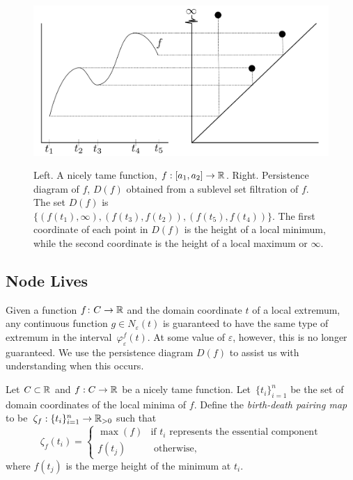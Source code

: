 \begin{figure}[htp]
    \centering
    {\includegraphics[width=.7\textwidth]{images/nodelife.pdf}} \\
    \caption{Left. A nicely tame function, $f:[a_1,a_2]\rightarrow \mathbb{R}$. Right. Persistence diagram of $f$, $D(f)$
	obtained from a sublevel set filtration of $f$.  The set
	$D(f)$ is $\{(f(t_1), \infty), (f(t_3), f(t_2)), (f(t_5), f(t_4))\}$. The first coordinate of each point in $D(f)$ is the height of a local minimum, while the second coordinate is the height of a local maximum or $\infty$.  }
    \label{fig:PD}
\end{figure}

\subsection{Node Lives}
\label{sec:node-lives}

Given a function $f \colon C \to \mathbb{R}$ and the domain coordinate $t$ of a local
extremum, any continuous function $g\in N_\varepsilon(t)$ is guaranteed to have 
the same type of extremum in the interval~$\varphi^f_{\varepsilon}(t)$. At some
value of $\varepsilon$, however, this is no longer guaranteed.
We use the persistence diagram $D(f)$ to assist us with understanding when this
occurs.

\begin{defn}[Birth-Death Pairing Map]
    Let $C \subset \mathbb{R}$ and $f:C\rightarrow \mathbb{R}$ be a nicely tame function.
    Let~$\{t_i\}_{i=1}^n$ be the
    set of domain coordinates of the local minima of $f$. Define the
    \emph{birth-death pairing map} to be~$\zeta_f: \{t_i\}_{i=1}^n \rightarrow \mathbb{R}_{>0}$ such that
    \[ \zeta_f(t_i) = \begin{cases}
        \max(f) & \text{if } t_i \text{ represents the essential component}\\
        f(t_j) & \text{ otherwise,}
    \end{cases}
    \]
    where $f(t_j)$ is the merge height of the minimum at $t_i$.
    \label{def:birth-death-map}
\end{defn}

